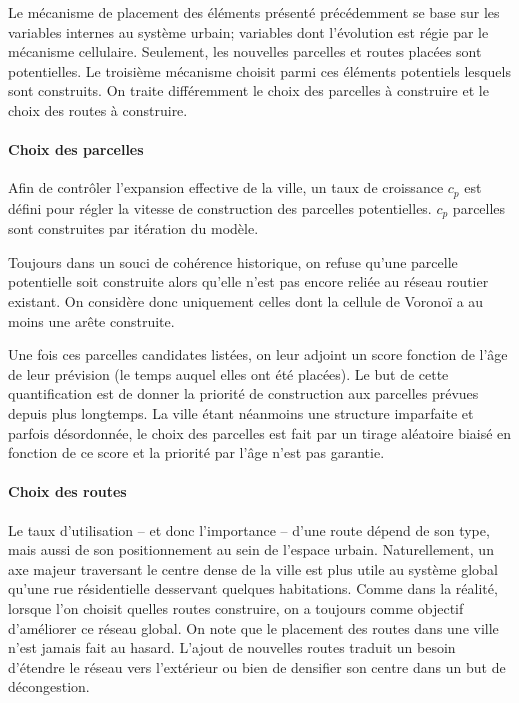 \documentclass[10pt]{article}
\begin{document}
Le mécanisme de placement des éléments présenté précédemment se base
sur les variables internes au système urbain; variables dont
l'évolution est régie par le mécanisme cellulaire. Seulement, les
nouvelles parcelles et routes placées sont potentielles. Le troisième
mécanisme choisit parmi ces éléments potentiels lesquels sont
construits. On traite différemment le choix des parcelles à construire
et le choix des routes à construire.

\paragraph{Choix des parcelles\\}

Afin de contrôler l'expansion effective de la ville, un taux de
croissance $c_p$ est défini pour régler la vitesse de construction des
parcelles potentielles. $c_p$ parcelles sont construites par itération
du modèle.

Toujours dans un souci de cohérence historique, on refuse qu'une
parcelle potentielle soit construite alors qu'elle n'est pas encore
reliée au réseau routier existant. On considère donc uniquement celles
dont la cellule de Voronoï a au moins une arête construite.

Une fois ces parcelles candidates listées, on leur adjoint un score
fonction de l'âge de leur prévision (le temps auquel elles ont été
placées). Le but de cette quantification est de donner la priorité de
construction aux parcelles prévues depuis plus longtemps. La ville
étant néanmoins une structure imparfaite et parfois désordonnée, le
choix des parcelles est fait par un tirage aléatoire biaisé en
fonction de ce score et la priorité par l'âge n'est pas garantie.

\paragraph{Choix des routes\\}

Le taux d'utilisation -- et donc l'importance -- d'une route dépend de
son type, mais aussi de son positionnement au sein de l'espace
urbain. Naturellement, un axe majeur traversant le centre dense de la
ville est plus utile au système global qu'une rue résidentielle
desservant quelques habitations. Comme dans la réalité, lorsque l'on
choisit quelles routes construire, on a toujours comme objectif
d'améliorer ce réseau global. On note que le placement des routes dans
une ville n'est jamais fait au hasard. L'ajout de nouvelles routes
traduit un besoin d'étendre le réseau vers l'extérieur ou bien de
densifier son centre dans un but de décongestion.
\end{document}
